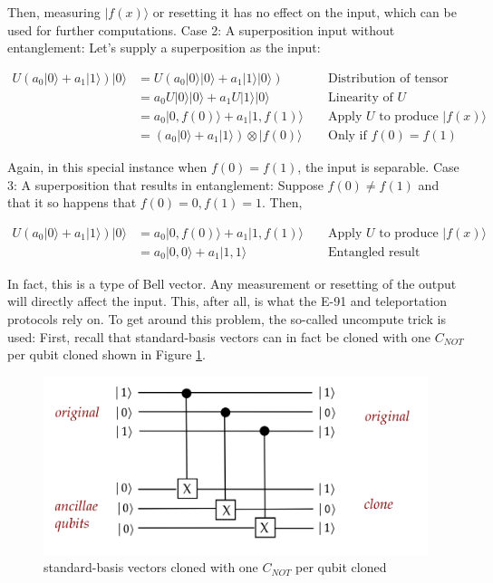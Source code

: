\documentclass[main.tex]{subfiles}
\begin{document}
    Then, measuring $|f(x)\rangle$ or resetting it has no effect on the input, which can be used for further computations. Case 2: A superposition input without entanglement: Let's supply a superposition as the input:
    
    $$
    \begin{aligned}
    U\left(a_{0}|0\rangle+a_{1}|1\rangle\right)|0\rangle &=U\left(a_{0}|0\rangle|0\rangle+a_{1}|1\rangle|0\rangle\right) & & \text { Distribution of tensor over addition } \\
    &=a_{0} U|0\rangle|0\rangle+a_{1} U|1\rangle|0\rangle & & \text { Linearity of } U \\
    &=a_{0}|0, f(0)\rangle+a_{1}|1, f(1)\rangle & & \text { Apply } U \text { to produce }|f(x)\rangle \\
    &=\left(a_{0}|0\rangle+a_{1}|1\rangle\right) \otimes|f(0)\rangle & & \text { Only if } f(0)=f(1)
    \end{aligned}
    $$
    
    Again, in this special instance when $f(0)=f(1)$, the input is separable. Case 3: A superposition that results in entanglement: Suppose $f(0) \neq f(1)$ and that it so happens that $f(0)=0, f(1)=1$. Then,
    
    $$
    \begin{aligned}
    U\left(a_{0}|0\rangle+a_{1}|1\rangle\right)|0\rangle &=a_{0}|0, f(0)\rangle+a_{1}|1, f(1)\rangle & & \text { Apply } U \text { to produce }|f(x)\rangle \\
    &=a_{0}|0,0\rangle+a_{1}|1,1\rangle & & \text { Entangled result }
    \end{aligned}
    $$
    
    In fact, this is a type of Bell vector. Any measurement or resetting of the output will directly affect the input. This, after all, is what the E-91 and teleportation protocols rely on. To get around this problem, the so-called uncompute trick is used: First, recall that standard-basis vectors can in fact be cloned with one $C_{NOT}$ per qubit cloned shown in Figure \ref{fig:40cloning}.
    
    \begin{figure}
        \centering
        \includegraphics[width=5in]{notes/figs/n10/40cloning.png}
        \caption{standard-basis vectors cloned with one $C_{NOT}$ per qubit cloned}
        \label{fig:40cloning}
    \end{figure}
    
\end{document}

